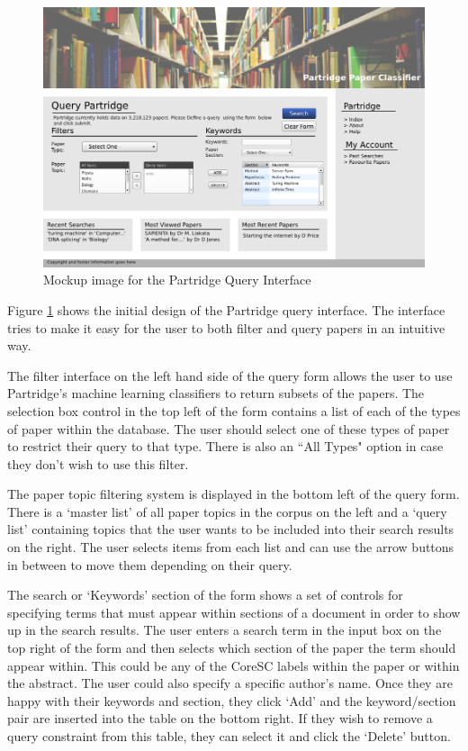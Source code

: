 \begin{figure}[!htb]
\vspace{5mm}
\centering
\includegraphics[width=\textwidth]{images/design/query_mockup.png}
\caption{Mockup image for the Partridge Query Interface}
\label{fig:query_mockup}
\end{figure}

Figure \ref{fig:query_mockup} shows the initial design of the Partridge query
interface. The interface tries to make it easy for the user to both filter and
query papers in an intuitive way.

The filter interface on the left hand side of the query form allows the user to
use Partridge's machine learning classifiers to return subsets of the papers.
The selection box control in the top left of the form contains a list of each
of the types of paper within the database. The user should select one of these
types of paper to restrict their query to that type. There is also an ``All
Types" option in case they don't wish to use this filter.

The paper topic filtering system is displayed in the bottom left of the query
form. There is a `master list' of all paper topics in the corpus on the left
and a `query list' containing topics that the user wants to be included into
their search results on the right. The user selects items from each list and
can use the arrow buttons in between to move them depending on their query.

The search or `Keywords' section of the form shows a set of controls for
specifying terms that must appear within sections of a document in order to show
up in the search results. The user enters a search term in the input box on the
top right of the form and then selects which section of the paper the term
should appear within. This could be any of the CoreSC labels within the paper or
within the abstract. The user could also specify a specific author's name. Once
they are happy with their keywords and section, they click `Add' and the
keyword/section pair are inserted into the table on the bottom right. If they
wish to remove a query constraint from this table, they can select it and click
the `Delete' button. 

